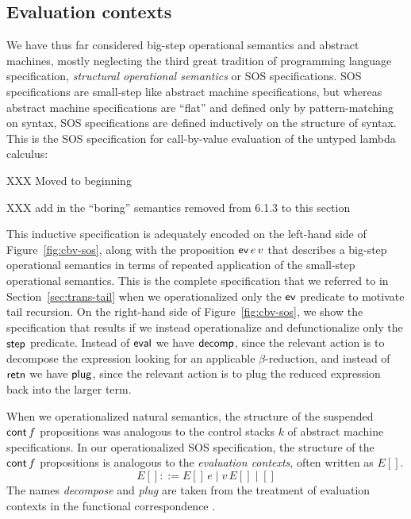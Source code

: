\subsection{Evaluation contexts}
\label{sec:evaluationcontexts}


We have thus far considered big-step operational semantics and
abstract machines, mostly neglecting the third great tradition of
programming language specification, {\it structural operational
  semantics} or SOS specifications. SOS specifications are small-step
like abstract machine specifications, but whereas abstract machine
specifications are ``flat'' and defined only by pattern-matching on
syntax, SOS specifications are defined inductively on the structure
of syntax. This is the SOS specification for 
call-by-value evaluation of the untyped lambda calculus:

XXX Moved to beginning

XXX add in the ``boring'' semantics removed from 6.1.3 to this section

This inductive specification is adequately encoded on the left-hand
side of Figure~\ref{fig:cbv-sos}, along with the proposition ${\sf
  ev}\,e\,v$ that describes a big-step operational semantics in terms
of repeated application of the small-step operational semantics. This
is the complete specification that we referred to in
Section~\ref{sec:trans-tail} when we operationalized only the ${\sf
  ev}$ predicate to motivate tail recursion. On the right-hand side of
Figure~\ref{fig:cbv-sos}, we show the specification that results if we
instead operationalize and defunctionalize only the 
${\sf step}$ predicate. Instead of ${\sf eval}$ we have 
${\sf decomp}$, since the relevant action is to decompose the
expression looking for an applicable $\beta$-reduction, and instead of 
${\sf retn}$ we have ${\sf plug}$, since the relevant action is 
to plug the reduced expression back into the larger term.

When we operationalized natural semantics, the structure of the
suspended ${\sf cont}\,f$ propositions was analogous to the control
stacks $k$ of abstract machine specifications. In our operationalized
SOS specification, the structure of the ${\sf cont}\,f$ propositions
is analogous to the {\it evaluation contexts}, often written as 
$E[]$.
\[
E[] ::= E[]\,e \mid v\,E[] \mid []
\]
The names {\it decompose} and {\it plug} are taken from the treatment
of evaluation contexts in the functional correspondence
\cite{danvy08defunctionalized}.


